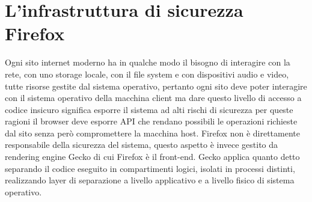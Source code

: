 \documentclass[]{sapthesis}
\begin{document}
\chapter{L'infrastruttura di sicurezza Firefox}
    Ogni sito internet moderno ha in qualche modo il bisogno di interagire con la rete,
    con uno storage locale, con il file system e con dispositivi audio e video, tutte
    risorse gestite dal sistema operativo, pertanto ogni sito deve poter interagire con
    il sistema operativo della macchina client ma dare questo livello di accesso a codice
    insicuro significa esporre il sistema ad alti rischi di sicurezza per queste ragioni
    il browser deve esporre API che rendano possibili le operazioni richieste dal sito
    senza però compromettere la macchina host.
    Firefox non è direttamente responsabile della sicurezza del sistema, questo aspetto è
    invece gestito da rendering engine Gecko di cui Firefox è il front-end.
    Gecko applica quanto detto separando il codice eseguito in compartimenti
    logici, isolati in processi distinti, realizzando layer di separazione a livello
    applicativo e a livello fisico di sistema operativo.
\end{document}
